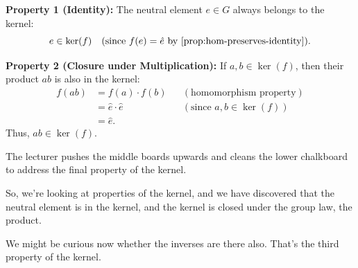 \begin{content}
\textbf{Property 1 (Identity):} The neutral element $e \in G$ always belongs to the kernel:
\begin{equation}\label{eq:ker-prop-1}
e \in \operatorname{ker}(f) \quad (\text{since } f(e) = \hat{e} \text{ by \cref{prop:hom-preserves-identity}}).
\end{equation}

\textbf{Property 2 (Closure under Multiplication):} If $a, b \in \operatorname{ker}(f)$, then their product $ab$ is also in the kernel:
\begin{align}
f(ab) &= f(a) \cdot f(b) && (\text{homomorphism property}) \nonumber \\
&= \hat{e} \cdot \hat{e} && (\text{since } a, b \in \operatorname{ker}(f)) \nonumber \\
&= \hat{e}. \label{eq:ker-prop-2}
\end{align}
Thus, $ab \in \operatorname{ker}(f)$.
\end{content}

\begin{note}
The lecturer pushes the middle boards upwards and cleans the lower chalkboard to address the final property of the kernel.
\end{note}

\begin{speech}[00:22:06 - 00:23:03]
So, we're looking at properties of the kernel, and we have discovered that the neutral element is in the kernel, and the kernel is closed under the group law, the product.

We might be curious now whether the inverses are there also. That's the third property of the kernel.
\end{speech}


